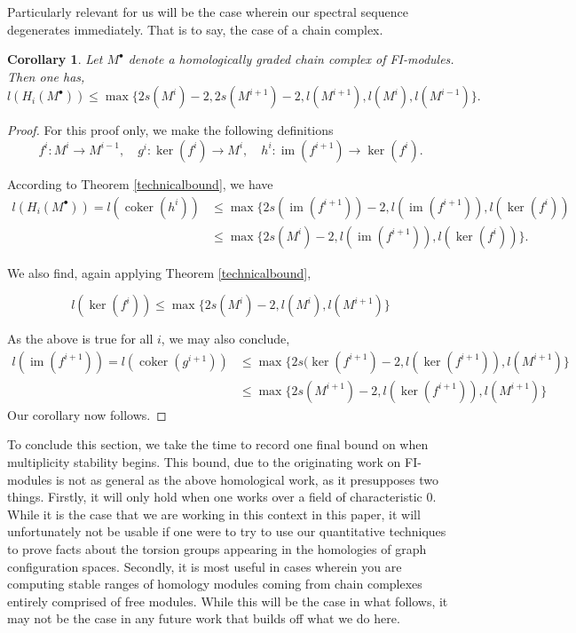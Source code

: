 \documentclass[12pt]{amsart}
\newtheorem{cor}[thm]{Corollary}
\theoremstyle{definition}
\newcommand{\coker}{\operatorname{coker}}
\newcommand{\im}{\operatorname{im}}
\begin{document}
Particularly relevant for us will be the case wherein our spectral sequence degenerates immediately. That is to say, the case of a chain complex.

\begin{cor}
    Let $M^\bullet$ denote a homologically graded chain complex of FI-modules. Then one has,
    \[
    l(H_i(M^\bullet)) \leq \max\{2s(M^i)-2, 2s(M^{i+1})-2,l(M^{i+1}),l(M^i),l(M^{i-1})\}.
    \]
\end{cor}

\begin{proof}
    For this proof only, we make the following definitions
    \[
        f^i:M^i\rightarrow M^{i-1},\quad 
        g^i: \ker(f^i)\rightarrow M^i, \quad
        h^i: \im(f^{i+1}) \rightarrow \ker(f^i).
    \]

    According to Theorem \ref{technicalbound}, we have
    \begin{align*}
            l(H_i(M^\bullet)) = l(\coker(h^i)) &\leq \max\{2s(\im(f^{i+1}))-2,l(\im(f^{i+1})),l(\ker(f^i))\\
            &\leq \max\{2s(M^{i})-2,l(\im(f^{i+1})),l(\ker(f^i))\}.
    \end{align*}

    We also find, again applying Theorem \ref{technicalbound},

    \[
        l(\ker(f^{i})) \leq \max\{2s(M^i)-2,l(M^i),l(M^{i+1})\}
    \]

    As the above is true for all $i$, we may also conclude,
    \begin{align*}
        l(\im(f^{i+1})) = l(\coker(g^{i+1})) &\leq \max\{2s(\ker(f^{i+1})-2,l(\ker(f^{i+1})),l(M^{i+1})\}\\
        &\leq \max\{2s(M^{i+1})-2,l(\ker(f^{i+1})),l(M^{i+1})\} 
    \end{align*}
Our corollary now follows.

\end{proof}

To conclude this section, we take the time to record one final bound on when multiplicity stability begins. This bound, due to the originating work on FI-modules \cite{CEF} is not as general as the above homological work, as it presupposes two things. Firstly, it will only hold when one works over a field of characteristic 0. While it is the case that we are working in this context in this paper, it will unfortunately not be usable if one were to try to use our quantitative techniques to prove facts about the torsion groups appearing in the homologies of graph configuration spaces. Secondly, it is most useful in cases wherein you are computing stable ranges of homology modules coming from chain complexes entirely comprised of free modules. While this will be the case in what follows, it may not be the case in any future work that builds off what we do here.
\end{document}
